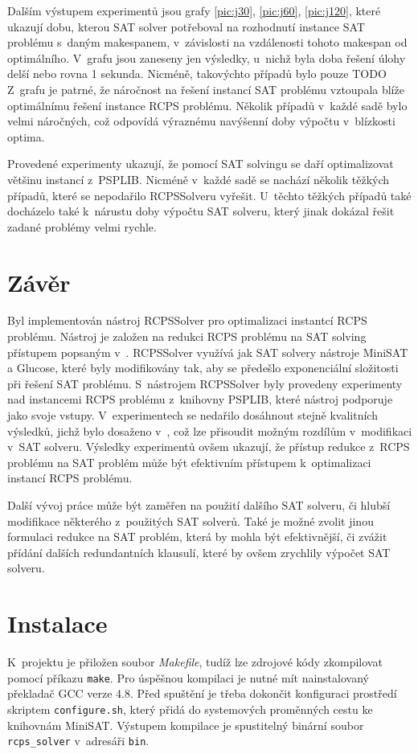 \documentclass[a4paper, 12pt]{article}
\begin{document}
Dalším výstupem experimentů jsou grafy \ref{pic:j30}, \ref{pic:j60}, \ref{pic:j120},
které ukazují dobu, kterou SAT solver potřeboval na rozhodnutí instance SAT problému
s~daným makespanem, v~závislosti na vzdálenosti tohoto makespan od optimálního.
V~grafu jsou zaneseny jen výsledky, u~nichž byla doba řešení úlohy delší nebo rovna 1 sekunda.
Nicméně, takovýchto případů bylo pouze TODO
Z~grafu je patrné, že náročnost na řešení instancí SAT problému vztoupala blíže optimálnímu řešení instance RCPS problému.
Několik případů v~každé sadě bylo velmi náročných, což odpovídá výraznému navýšenní doby výpočtu v~blízkosti optima.

Provedené experimenty ukazují, že pomocí SAT solvingu se daří optimalizovat většinu instancí z~PSPLIB.
Nicméně v~každé sadě se nachází několik těžkých případů, které se nepodařilo RCPSSolveru vyřešit.
U~těchto těžkých případů také docházelo také k~nárustu doby výpočtu SAT solveru, který jinak dokázal
řešit zadané problémy velmi rychle.

\section{Závěr}
Byl implementován nástroj RCPSSolver pro optimalizaci instantcí RCPS problému.
Nástroj je založen na redukci RCPS problému na SAT solving přístupem popsaným v~\cite{horbach:10}.
RCPSSolver využívá jak SAT solvery nástroje MiniSAT a Glucose, které byly modifikovány tak,
aby se předešlo exponenciální složitosti při řešení SAT problému.
S~nástrojem RCPSSolver byly provedeny experimenty nad instancemi RCPS problému
z~knihovny PSPLIB, které nástroj podporuje jako svoje vstupy.
V~experimentech se nedařilo dosáhnout stejně kvalitních výsledků, jichž bylo dosaženo v~\cite{horbach:10},
což lze přisoudit možným rozdílům v~modifikaci v~SAT solveru.
Výsledky experimentů ovšem ukazují, že přístup redukce z~RCPS problému na SAT problém
může být efektivním přístupem k~optimalizaci instancí RCPS problému.

Další vývoj práce může být zaměřen na použití dalšího SAT solveru, či hlubší
modifikace některého z~použitých SAT solverů.
Také je možné zvolit jinou formulaci redukce na SAT problém, která by mohla být
efektivnější, či zvážit přídání dalších redundantních klausulí, které by ovšem
zrychlily výpočet SAT solveru.

\newpage
\appendix
\section{Instalace}
\label{app:install}
K~projektu je přiložen soubor \emph{Makefile}, tudíž lze zdrojové kódy zkompilovat pomocí příkazu \texttt{make}.
Pro úspěšnou kompilaci je nutné mít nainstalovaný překladač GCC verze 4.8.
Před spuštění je třeba dokončit konfiguraci prostředí skriptem \texttt{configure.sh},
který přidá do systemových proměnných cestu ke knihovnám MiniSAT.
Výstupem kompilace je spustitelný binární soubor \texttt{rcps\_solver} v~adresáři \texttt{bin}.
\end{document}
